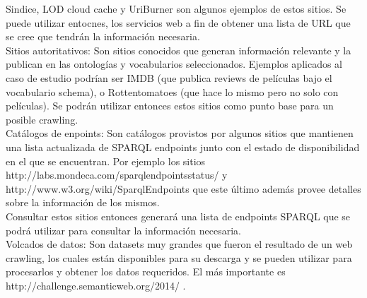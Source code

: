 Sindice, LOD cloud cache y UriBurner son algunos ejemplos de estos sitios. Se puede utilizar entocnes, los servicios web a fin
de obtener una lista de URL que se cree que tendrán la información necesaria.\\
Sitios autoritativos: Son sitios conocidos que generan información relevante y la publican en las ontologías y vocabularios 
seleccionados. Ejemplos aplicados al caso de estudio podrían ser IMDB (que publica reviews de películas bajo el vocabulario schema), o Rottentomatoes
(que hace lo mismo pero no solo con películas). Se podrán utilizar entonces estos sitios como punto base para un posible crawling.\\
Catálogos de enpoints: Son catálogos provistos por algunos sitios que mantienen una lista actualizada de SPARQL endpoints 
junto con el estado de disponibilidad en el que se encuentran. Por ejemplo los sitios http://labs.mondeca.com/sparqlendpointsstatus/ y 
http://www.w3.org/wiki/SparqlEndpoints que este último además provee detalles sobre la información de los mismos.\\
Consultar estos sitios entonces generará una lista de endpoints SPARQL que se podrá utilizar para consultar la información necesaria.\\
Volcados de datos: Son datasets muy grandes que fueron el resultado de un web crawling, los cuales están disponibles para su descarga 
y se pueden utilizar para procesarlos y obtener los datos requeridos. El más importante es http://challenge.semanticweb.org/2014/ .\\
\\



